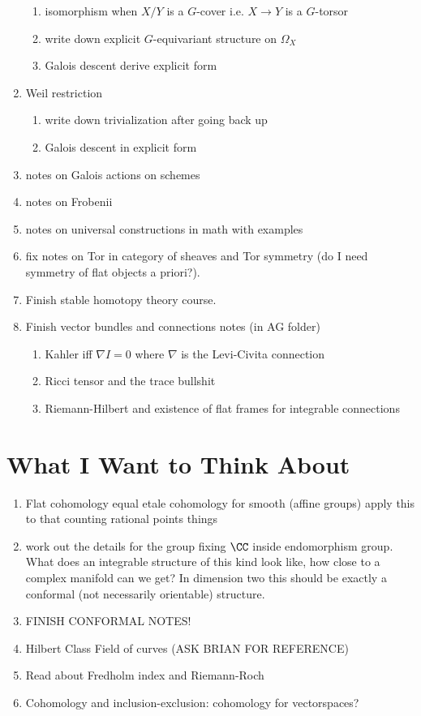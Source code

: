 \documentclass[12pt]{article}
\begin{document}
\begin{enumerate}
\begin{enumerate}
\item isomorphism when $X/Y$ is a $G$-cover i.e. $X \to Y$ is a $G$-torsor
\item write down explicit $G$-equivariant structure on $\Omega_X$
\item Galois descent derive explicit form
\end{enumerate}
\item Weil restriction
\begin{enumerate}
\item write down trivialization after going back up
\item Galois descent in explicit form
\end{enumerate}
\item notes on Galois actions on schemes
\item notes on Frobenii
\item notes on universal constructions in math with examples

\item fix notes on Tor in category of sheaves and Tor symmetry (do I need symmetry of flat objects a priori?).

\item Finish stable homotopy theory course.

\item Finish vector bundles and connections notes (in AG folder)
\begin{enumerate}
\item Kahler iff $\nabla I = 0$ where $\nabla$ is the Levi-Civita connection
\item Ricci tensor and the trace bullshit 
\item Riemann-Hilbert and existence of flat frames for integrable connections
\end{enumerate}
\end{enumerate}

\section{What I Want to Think About}

\begin{enumerate}
\item Flat cohomology equal etale cohomology for smooth (affine groups) apply this to that counting rational points things
\item work out the details for the group fixing $\CC$ inside endomorphism group. What does an integrable structure of this kind look like, how close to a complex manifold can we get? In dimension two this should be exactly a conformal (not necessarily orientable) structure. 
\item FINISH CONFORMAL NOTES!
\item Hilbert Class Field of curves (ASK BRIAN FOR REFERENCE)
\item Read about Fredholm index and Riemann-Roch
\item Cohomology and inclusion-exclusion: cohomology for vectorspaces?
\end{enumerate}
\end{document}
